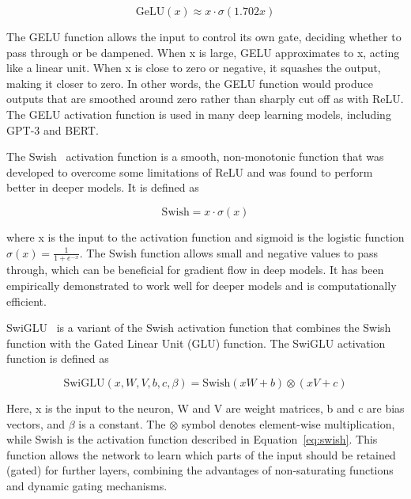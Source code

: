 \begin{equation}
	\text{GeLU}(x) \approx x \cdot \sigma(1.702x)
	\label{eq:geluapprox2}
\end{equation}

The GELU function allows the input to control its own gate, deciding whether to pass through or be dampened.
When x is large, GELU approximates to x, acting like a linear unit.
When x is close to zero or negative, it squashes the output, making it closer to zero.
In other words, the GELU function would produce outputs that are smoothed around zero rather than sharply cut off as with ReLU\@.
The GELU activation function is used in many deep learning models, including GPT-3 and BERT\@.

The Swish~\cite{ramachandran2017searching} activation function is a smooth, non-monotonic function that was developed to overcome some limitations of ReLU and was found to perform better in deeper models.
It is defined as

\begin{equation}
	\text{Swish} = x \cdot \sigma\left(x\right)
	\label{eq:swish}
\end{equation}

\noindent where x is the input to the activation function and sigmoid is the logistic function \(\sigma(x) = \frac{1}{1+e^{-x}}\).
The Swish function allows small and negative values to pass through, which can be beneficial for gradient flow in deep models.
It has been empirically demonstrated to work well for deeper models and is computationally efficient.

SwiGLU~\cite{shazeer2020glu} is a variant of the Swish activation function that combines the Swish function with the Gated Linear Unit (GLU) function.
The SwiGLU activation function is defined as

\begin{equation}
	\text{SwiGLU}\left(x, W, V, b, c, \beta\right) = \text{Swish}\left(xW + b\right) \otimes \left(xV + c\right)
	\label{eq:swiglu}
\end{equation}

\noindent Here, x is the input to the neuron, W and V are weight matrices, b and c are bias vectors, and $\beta$ is a constant.
The $\otimes$ symbol denotes element-wise multiplication, while Swish is the activation function described in Equation~\ref{eq:swish}.
This function allows the network to learn which parts of the input should be retained (gated) for further layers, combining the advantages of non-saturating functions and dynamic gating mechanisms.

